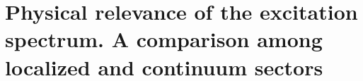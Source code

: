 \documentclass[reprint,aps,prb]{revtex4-1}
\begin{document}
\section{Physical relevance of the excitation spectrum. A comparison among localized and continuum sectors}
% 
% 
% 
% 
% 
% 
\end{document}

